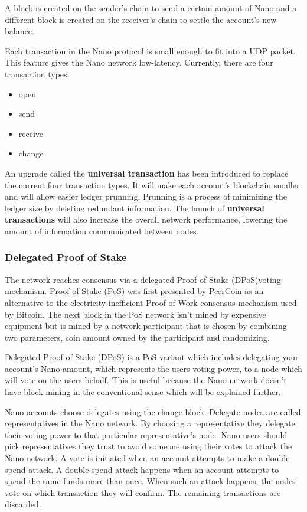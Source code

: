 \documentclass{ferseminar}
\begin{document}
A block is created on the sender's chain to send a certain amount of Nano and a different block is created on the receiver's chain to settle the account's new balance.

Each transaction in the Nano protocol is small enough to fit into a UDP packet. This feature gives the Nano network low-latency. Currently, there are four transaction types: 
\begin{itemize}
	\item open
	\item send
	\item receive
	\item change
\end{itemize}

An upgrade called the \textbf{universal transaction} has been introduced to replace the current four transaction types. It will make each account's blockchain smaller and will allow easier ledger prunning. Prunning is a process of minimizing the ledger size by deleting redundant information. The launch of \textbf{universal transactions} will also increase the overall network performance, lowering the amount of information communicated between nodes.


\subsubsection{Delegated Proof of Stake}

The network reaches consensus via a delegated Proof of Stake (DPoS)voting mechanism. Proof of Stake (PoS) was first presented by PeerCoin \cite{Peercoin} as an alternative to the electricity-inefficient Proof of Work consensus mechanism used by Bitcoin. The next block in the PoS network isn't mined by expensive equipment but is mined by a network participant that is chosen by combining two parameters, coin amount owned by the participant and randomizing.

Delegated Proof of Stake (DPoS) is a PoS variant which includes delegating your account's Nano amount, which represents the users voting power, to a node which will vote on the users behalf. This is useful because the Nano network doesn't have block mining in the conventional sense which will be explained further. 

Nano accounts choose delegates using the change block. Delegate nodes are called representatives in the Nano network. By choosing a representative they delegate their voting power to that particular representative's node. Nano users should pick representatives they trust to avoid someone using their votes to attack the Nano network. A vote is initiated when an account attempts to make a double-spend attack. A double-spend attack happens when an account attempts to spend the same funds more than once. When such an attack happens, the nodes vote on which transaction they will confirm. The remaining transactions are discarded.
\end{document}
